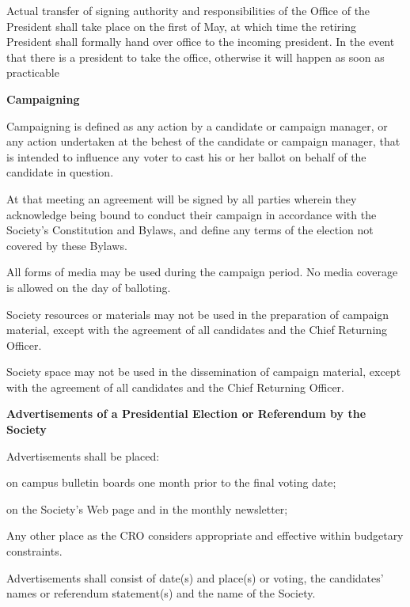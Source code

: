 \begin{longenum}[ label*=\thesection.\arabic*., align=left]
\begin{longenum}[label*=\arabic*., align=left]
  \item Actual transfer of signing authority and responsibilities of the Office of the President shall take place on the first of May, at which time the retiring President shall formally hand over office to the incoming president. In the event that there is a president to take the office, otherwise it will happen as soon as practicable
  
 \end{longenum}
 \item \textbf{Campaigning}
  \begin{longenum}[label*=\arabic*., align=left]
 
 \item Campaigning is defined as any action by a candidate or campaign manager, or any action undertaken at the behest of the candidate or campaign manager, that is intended to influence any voter to cast his or her ballot on behalf of the candidate in question.
\item At that meeting an agreement will be signed by all parties wherein they acknowledge being bound to conduct their campaign in accordance with the Society's Constitution and Bylaws, and define any terms of the election not covered by these Bylaws.
\item All  forms of media may be used during  the campaign period. No media coverage is allowed on  the day of balloting.
\item  Society resources or materials may not be used in the preparation of campaign material, except with the agreement of all candidates and the Chief Returning Officer.
\item Society space may not be used in the dissemination of campaign material, except with the agreement of all candidates and the Chief Returning Officer.
 \end{longenum}
 \item 	\textbf{Advertisements	of	a	Presidential	Election	or	Referendum	by	the	Society }
  \begin{longenum}[label*=\arabic*., align=left]
  \item Advertisements shall be placed:
 \begin{longenum}[label*=\arabic*., align=left]
\item on campus bulletin boards one month prior to the final voting date;
\item on the Society's Web page and in the monthly newsletter;
\item Any other place as the CRO considers appropriate and effective within budgetary 
constraints.
 \end{longenum}
\item Advertisements shall consist of date(s) and place(s) or voting, the candidates' names or referendum 
statement(s) and the name of the Society. 
 \end{longenum}
  

\end{longenum}
